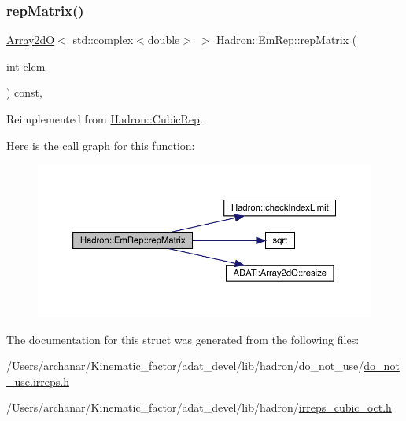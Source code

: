\subsubsection{\texorpdfstring{repMatrix()}{repMatrix()}\hspace{0.1cm}{\footnotesize\ttfamily [2/2]}}
{\footnotesize\ttfamily \mbox{\hyperlink{classADAT_1_1Array2dO}{Array2dO}}$<$ std\+::complex$<$double$>$ $>$ Hadron\+::\+Em\+Rep\+::rep\+Matrix (\begin{DoxyParamCaption}\item[{int}]{elem }\end{DoxyParamCaption}) const\hspace{0.3cm}{\ttfamily [inline]}, {\ttfamily [virtual]}}



Reimplemented from \mbox{\hyperlink{structHadron_1_1CubicRep_ac5d7e9e6f4ab1158b5fce3e4ad9e8005}{Hadron\+::\+Cubic\+Rep}}.

Here is the call graph for this function\+:
\nopagebreak
\begin{figure}[H]
\begin{center}
\leavevmode
\includegraphics[width=350pt]{d6/d4b/structHadron_1_1EmRep_a8c91198aaf2473fd63a22c16ed7415f2_cgraph}
\end{center}
\end{figure}


The documentation for this struct was generated from the following files\+:\begin{DoxyCompactItemize}
\item 
/\+Users/archanar/\+Kinematic\+\_\+factor/adat\+\_\+devel/lib/hadron/do\+\_\+not\+\_\+use/\mbox{\hyperlink{do__not__use_8irreps_8h}{do\+\_\+not\+\_\+use.\+irreps.\+h}}\item 
/\+Users/archanar/\+Kinematic\+\_\+factor/adat\+\_\+devel/lib/hadron/\mbox{\hyperlink{lib_2hadron_2irreps__cubic__oct_8h}{irreps\+\_\+cubic\+\_\+oct.\+h}}\end{DoxyCompactItemize}
